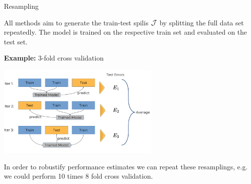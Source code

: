 \documentclass[11pt,compress,t,notes=noshow, xcolor=table]{beamer}
\begin{document}
\begin{vbframe}{Resampling}



All methods aim to generate the train-test spilis $\mathcal{J}$ by splitting the full data set repeatedly.
The model is trained on the respective train set and evaluated on the test set.

\textbf{Example:} 3-fold cross validation

\begin{center}
\includegraphics[width=0.6\textwidth]{figure_man/crossvalidation.png}
\end{center}


In order to robustify performance estimates we can repeat these resamplings, e.g. we could perform 10 times 8 fold cross validation.

\end{vbframe}





\endlecture
\end{document}
